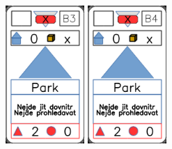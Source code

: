 \documentclass[a4paper]{article}
\begin{document}
	\includegraphics[width=3.0cm]{img-3_22}
	\includegraphics[width=3.0cm]{img-3_23}
\end{document}
